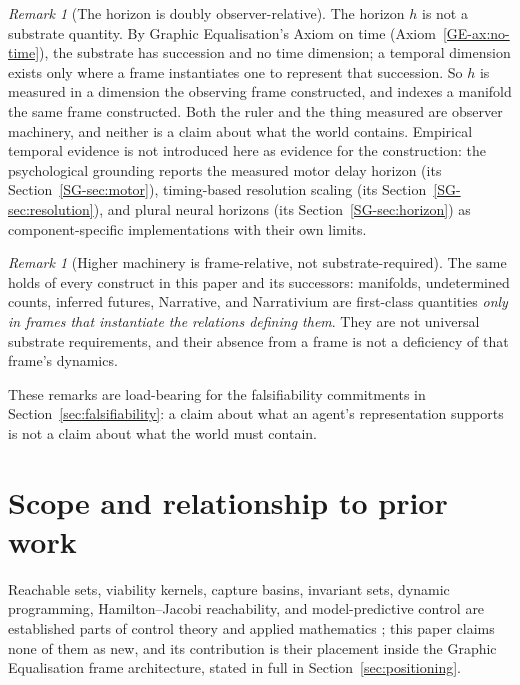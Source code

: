 \documentclass[11pt,a4paper]{article}
\theoremstyle{remark}
\newtheorem{remark}[definition]{Remark}
\begin{document}
\begin{remark}[The horizon is doubly observer-relative]\label{rem:horizon-observer}
The horizon $h$ is not a substrate quantity. By Graphic Equalisation's Axiom on time (Axiom~\ref{GE-ax:no-time}), the substrate has succession and no time dimension; a temporal dimension exists only where a frame instantiates one to represent that succession. So $h$ is measured in a dimension the observing frame constructed, and indexes a manifold the same frame constructed. Both the ruler and the thing measured are observer machinery, and neither is a claim about what the world contains. Empirical temporal evidence is not introduced here as evidence for the construction: the psychological grounding reports the measured motor delay horizon (its Section~\ref{SG-sec:motor}), timing-based resolution scaling (its Section~\ref{SG-sec:resolution}), and plural neural horizons (its Section~\ref{SG-sec:horizon}) as component-specific implementations with their own limits.
\end{remark}

\begin{remark}[Higher machinery is frame-relative, not substrate-required]\label{rem:optional-machinery}
The same holds of every construct in this paper and its successors: manifolds, undetermined counts, inferred futures, Narrative, and Narrativium are first-class quantities \emph{only in frames that instantiate the relations defining them}. They are not universal substrate requirements, and their absence from a frame is not a deficiency of that frame's dynamics.
\end{remark}

These remarks are load-bearing for the falsifiability commitments in Section~\ref{sec:falsifiability}: a claim about what an agent's representation supports is not a claim about what the world must contain.

\section{Scope and relationship to prior work}\label{sec:scope}

Reachable sets, viability kernels, capture basins, invariant sets, dynamic programming, Hamilton--Jacobi reachability, and model-predictive control are established parts of control theory and applied mathematics \citep{bellman1957,aubin1990,aubin1991,mitchell2005,bansal2017,rawlings2017}; this paper claims none of them as new, and its contribution is their placement inside the Graphic Equalisation frame architecture, stated in full in Section~\ref{sec:positioning}.
\end{document}
